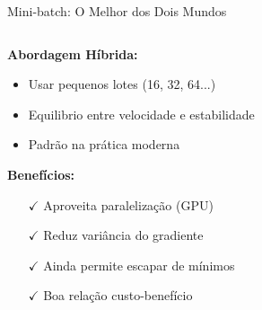 \documentclass[xcolor=dvipsnames,t,aspectratio=169]{beamer}
\newcommand{\highlight}[1]{{\color{nes_dark_orange} #1}}
\begin{document}
\begin{frame}[c]{Mini-batch: O Melhor dos Dois Mundos}
    \begin{columns}[c]
        \begin{column}{0.55\textwidth}
            \textbf{Abordagem Híbrida:}
            \begin{itemize}
                \item Usar \highlight{pequenos lotes} (16, 32, 64...)
                \item Equilibrio entre velocidade e estabilidade
                \item Padrão na prática moderna
            \end{itemize}
            
            \vspace{0.5cm}
            \textbf{Benefícios:}
            \begin{itemize}
                \item[$\checkmark$] Aproveita paralelização (GPU)
                \item[$\checkmark$] Reduz variância do gradiente
                \item[$\checkmark$] Ainda permite escapar de mínimos
                \item[$\checkmark$] Boa relação custo-benefício
            \end{itemize}
        \end{column}
        \begin{column}{0.45\textwidth}
        \end{column}
    \end{columns}
\end{frame}
\end{document}
